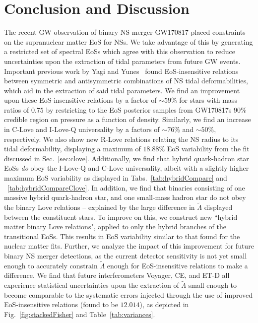 \documentclass[prd,twocolumn,nofootinbib,superscriptaddress,amsmath,amssymb]{revtex4-1}
\begin{document}
\section{Conclusion and Discussion}\label{sec:conclusion}
The recent GW observation of binary NS merger GW170817 placed constraints on the supranuclear matter EoS for NSs.
We take advantage of this by generating a restricted set of spectral EoSs which agree with this observation to reduce uncertainties upon the extraction of tidal parameters from future GW events.
Important previous work by Yagi and Yunes~\cite{Yagi:ILQ,Yagi:binLove} found EoS-insensitive relations between symmetric and antisymmetric combinations of NS tidal deformabilities, which aid in the extraction of said tidal parameters.
We find an improvement upon these EoS-insensitive relations by a factor of $\sim 59$\% for stars with mass ratios of $0.75$ by restricting to the EoS posterior samples from GW170817s 90\% credible region on pressure as a function of density.
Similarly, we find an increase in C-Love and I-Love-Q universality by a factors of $\sim 76$\% and $\sim 50$\%, respectively.
We also show new R-Love relations relating the NS radius to its tidal deformability, displaying a maximum of $18.88\%$ EoS variability from the fit discussed in Sec.~\ref{sec:clove}.
Additionally, we find that hybrid quark-hadron star EoSs \emph{do} obey the I-Love-Q and C-Love universality, albeit with a slightly higher maximum EoS variability as displayed in Tabs.~\ref{tab:hybridCompare} and ~\ref{tab:hybridCompareClove}.
In addition, we find that binaries consisting of one massive hybrid quark-hadron star, and one small-mass hadron star do not obey the binary Love relations -- explained by the large difference in $\tilde{\Lambda}$ displayed between the constituent stars.
To improve on this, we construct new ``hybrid matter binary Love relations", applied to only the hybrid branches of the transitional EoSs.
This results in EoS variability similar to that found for the nuclear matter fits.
Further, we analyze the impact of this improvement for future binary NS merger detections, as the current detector sensitivity is not yet small enough to accurately constrain $\tilde{\Lambda}$ enough for EoS-insensitive relations to make a difference.
We find that future interferometers Voyager, CE, and ET-D all experience statistical uncertainties upon the extraction of $\tilde{\Lambda}$ small enough to become comparable to the systematic errors injected through the use of improved EoS-insensitive relations (found to be $12.014$), as depicted in Fig.~\ref{fig:stackedFisher} and Table~\ref{tab:variances}.
\end{document}
